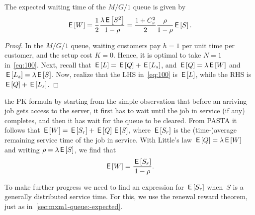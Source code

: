 \documentclass[queueing-book.tex]{subfiles}
\begin{document}
\begin{theorem}
The expected waiting time of the $M/G/1$ queue is given by
\begin{equation*}
 \,\mathsf{E}\left[W\right] = \frac 1 2 \frac{\lambda \,\mathsf{E}\left[S^2\right]}{1-\rho} =\frac{1 + C_s^2}2 \frac{\rho}{1-\rho} \,\mathsf{E}\left[S\right].
\end{equation*}
\end{theorem}
\begin{proof}
In the $M/G/1$ queue, waiting customers pay $h=1$ per unit time per customer, and the setup cost $K=0$. Hence, it is optimal to take $N=1$ in~\cref{eq:100}.
Next, recall that $\,\mathsf{E}\left[L\right] = \,\mathsf{E}\left[Q\right] + \,\mathsf{E}\left[L_s\right]$, and $\,\mathsf{E}\left[Q\right] = \lambda \,\mathsf{E}\left[W\right]$ and $\,\mathsf{E}\left[L_s\right] = \lambda \,\mathsf{E}\left[S\right]$. Now,  realize that the LHS in~\cref{eq:100} is $\,\mathsf{E}\left[L\right]$, while the RHS is $\,\mathsf{E}\left[Q\right] + \,\mathsf{E}\left[L_s\right]$.
\end{proof}


 the PK formula by starting from the simple observation that before an arriving job gets access to the server, it first has to wait until the job in service (if any) completes, and then it has wait for the queue to be cleared.
From PASTA it follows that $\,\mathsf{E}\left[W\right] = \,\mathsf{E}\left[S_r\right] + \,\mathsf{E}\left[Q\right] \,\mathsf{E}\left[S\right]$, where $\,\mathsf{E}\left[S_r\right]$ is the (time-)average remaining service time of the job in service.
With Little's law $\,\mathsf{E}\left[Q\right] = \lambda \,\mathsf{E}\left[W\right]$ and writing $\rho = \lambda \,\mathsf{E}\left[S\right]$, we find that
\begin{equation*}
 \,\mathsf{E}\left[W\right] = \frac{\,\mathsf{E}\left[S_r\right]}{1-\rho}.
\end{equation*}

To make further progress we need to find an expression for $\,\mathsf{E}\left[S_r\right]$ when~$S$ is a generally distributed service time.
For this, we use the renewal reward theorem, just as in~\cref{sec:mxm1-queue:-expected}.
\end{document}

